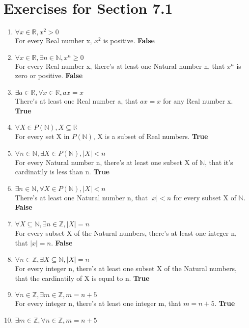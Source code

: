 \documentclass[12pt]{article}
\begin{document}
\section*{Exercises for Section 7.1}
\begin{enumerate}
    \item $\forall x \in \mathbb{R}, x^2 > 0$\\
	For every Real number x, $x^2$ is positive. \textbf{False}
    \item $\forall x \in \mathbb{R}, \exists n \in \mathbb{N}, x^n \ge 0$\\
	For every Real number x, there's at least one Natural number n, that $x^n$ is zero or positive. \textbf{False}
    \item $\exists a \in \mathbb{R}, \forall x \in \mathbb{R}, ax=x$\\
	There's at least one Real number a, that $ax=x$ for any Real number x. \textbf{True}
    \item $\forall X \in P(\mathbb{N}), X \subseteq \mathbb{R}$ \\
	For every set X in $P(\mathbb{N})$, X is a subset of Real numbers. \textbf{True}
    \item $\forall n \in \mathbb{N}, \exists X \in P(\mathbb{N}), |X| < n$\\
	For every Natural number n, there's at least one subset X of $\mathbb{N}$, that it's cardinatily is less than n. \textbf{True}
    \item $\exists n \in \mathbb{N}, \forall X \in P(\mathbb{N}), |X| < n$\\
    There's at least one Natural number n, that $|x| < n$ for every subset X of $\mathbb{N}$. \textbf{False}
    \item $\forall X \subseteq \mathbb{N}, \exists n \in \mathbb{Z}, |X| = n$\\
	For every subset X of the Natural numbers, there's at least one integer n, that $|x| = n$. \textbf{False}
    \item $\forall n \in \mathbb{Z}, \exists X \subseteq \mathbb{N}, |X| = n$\\
	For every integer n, there's at least one subset X of the Natural numbers, that the cardinatily of X is equal to n. \textbf{True}
    \item $\forall n \in \mathbb{Z}, \exists m \in \mathbb{Z}, m = n + 5$\\
	For every integer n, there's at least one integer m, that $m=n+5$. \textbf{True}
    \item $\exists m \in \mathbb{Z}, \forall n \in \mathbb{Z}, m = n+5$\\

\end{enumerate}
\end{document}

